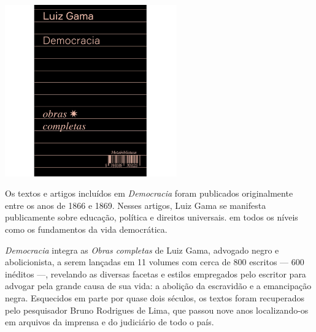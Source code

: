 \pagestyle{hedra}
\label{hedra}

\begin{center}
\hspace*{-3.6cm}
\hspace*{3.1cm}\includegraphics[width=74mm]{./CAPAS/democracia.jpg}
\end{center}
\hspace*{-7cm}\hrulefill\hspace*{-7cm}
\medskip

\noindent{}Os textos e artigos incluídos em \textit{Democracia} foram publicados originalmente entre os anos de 1866 e 1869. Nesses artigos, Luiz Gama se manifesta publicamente sobre educação, política e direitos universais.  em todos os níveis como os fundamentos da vida democrática.

\textit{Democracia} integra as \textit{Obras completas} de Luiz Gama, advogado negro e abolicionista, a serem lançadas em 11 volumes com cerca de 800 escritos --- 600 inéditos ---, revelando as diversas facetas e estilos empregados pelo escritor para advogar pela grande causa de sua vida: a abolição da escravidão e a emancipação negra. Esquecidos em parte por quase dois séculos, os textos foram recuperados pelo pesquisador Bruno Rodrigues de Lima, que passou nove anos localizando-os em arquivos da imprensa e do judiciário de todo o país.


